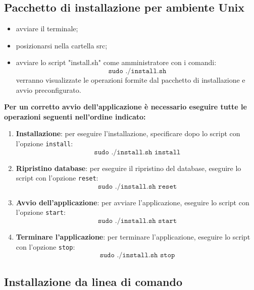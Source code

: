 \documentclass[12pt,a4paper]{article}
\begin{document}
		\subsection{Pacchetto di installazione per ambiente Unix}
		\begin{itemize}
			\item avviare il terminale;
			\item posizionarsi nella cartella src;
			\item avviare lo script "install.sh" come amministratore con i comandi:
		\[ 	\texttt{sudo  ./install.sh} \]
		verranno visualizzate le operazioni formite dal pacchetto di installazione e avvio preconfigurato.
	\end{itemize}
		\textbf{Per un corretto avvio dell'applicazione è necessario eseguire tutte le operazioni seguenti nell'ordine indicato:}
	\begin{enumerate}
		\item \textbf{Installazione}: per eseguire l'installazione, specificare dopo lo script con l'opzione \texttt{install}:
	 \[ 	\texttt{sudo  ./install.sh install} \]
		\item \textbf{Ripristino database}: per eseguire il ripristino del database, eseguire lo script con l'opzione \texttt{reset}:
		 \[ 	\texttt{sudo  ./install.sh reset} \]
		\item \textbf{Avvio dell'applicazione}: per avviare l'applicazione, eseguire lo script con l'opzione \texttt{start}:
		 \[ 	\texttt{sudo  ./install.sh start} \]
		\item \textbf{Terminare l'applicazione}: per terminare l'applicazione, eseguire lo script con l'opzione \texttt{stop}:
			 \[ 	\texttt{sudo  ./install.sh stop} \]
	
			

		\end{enumerate}
	\subsection{Installazione da linea di comando}
\end{document}
